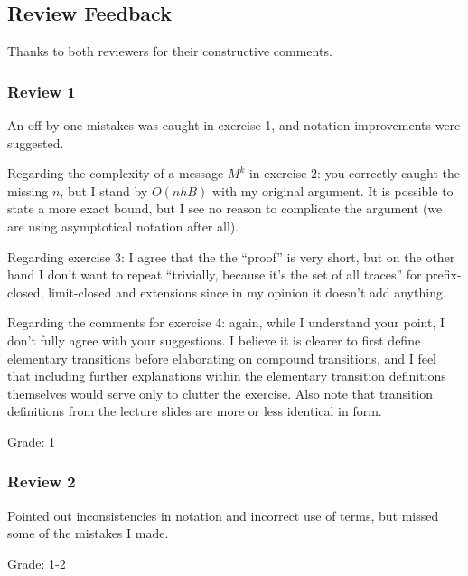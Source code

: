 \pagebreak
\subsection*{Review Feedback}

Thanks to both reviewers for their constructive comments.

\begin{comment}
The final version of your homework must also include a (single) grade and some
explanatory text for every review you have got, which shall reflect its
appropriateness, utility, ... for improving your work.
\end{comment}

\subsubsection*{Review 1}

An off-by-one mistakes was caught in
exercise 1, and notation improvements were suggested.

Regarding the complexity of a message $M^k$ in exercise 2: you correctly caught
the missing $n$, but I stand by $O(nhB)$ with my original argument. It is
possible to state a more exact bound, but I see no reason to complicate the argument
(we are using asymptotical notation after all).

Regarding exercise 3: I agree that the the ``proof'' is very short, but on the
other hand I don't want to repeat ``trivially, because it's the set of all traces''
for prefix-closed, limit-closed and extensions since in my opinion it doesn't
add anything.

Regarding the comments for exercise 4: again, while I understand your point,
I don't fully agree with your suggestions. I believe it is clearer to first
define elementary transitions before elaborating on compound transitions,
and I feel that including further explanations within the elementary transition
definitions themselves would serve only to clutter the exercise. Also note
that transition definitions from the lecture slides are more or less identical in form.

Grade: 1

\subsubsection*{Review 2}

Pointed out inconsistencies in notation and incorrect use of terms, but missed
some of the mistakes I made.

Grade: 1-2
